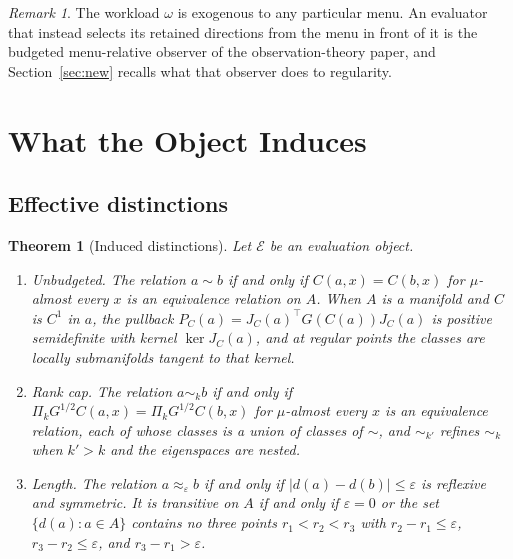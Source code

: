 \documentclass[11pt]{article}
\newtheorem{theorem}{Theorem}
\theoremstyle{definition}
\theoremstyle{remark}
\newtheorem*{remark}{Remark}
\newcommand{\Ev}{\mathcal{E}}
\newcommand{\PC}{P_{C}}
\begin{document}
\begin{remark}
The workload $\omega$ is exogenous to any particular menu.
An evaluator that instead selects its retained directions from the menu in front of it is the budgeted menu-relative observer of the observation-theory paper, and Section~\ref{sec:new} recalls what that observer does to regularity.
\end{remark}

\section{What the Object Induces}
\label{sec:derive}

\subsection{Effective distinctions}

\begin{theorem}[Induced distinctions]
\label{thm:dist}
Let $\Ev$ be an evaluation object.
\begin{enumerate}
\item[(a)] \emph{Unbudgeted.} The relation $a\sim b$ if and only if $C(a,x)=C(b,x)$ for $\mu$-almost every $x$ is an equivalence relation on $A$. When $A$ is a manifold and $C$ is $C^{1}$ in $a$, the pullback $\PC(a)=J_{C}(a)^{\top}G(C(a))J_{C}(a)$ is positive semidefinite with kernel $\ker J_{C}(a)$, and at regular points the classes are locally submanifolds tangent to that kernel.
\item[(b)] \emph{Rank cap.} The relation $a\sim_{k}b$ if and only if $\Pi_{k}G^{1/2}C(a,x)=\Pi_{k}G^{1/2}C(b,x)$ for $\mu$-almost every $x$ is an equivalence relation, each of whose classes is a union of classes of $\sim$, and $\sim_{k'}$ refines $\sim_{k}$ when $k'>k$ and the eigenspaces are nested.
\item[(c)] \emph{Length.} The relation $a\approx_{\varepsilon}b$ if and only if $|d(a)-d(b)|\le\varepsilon$ is reflexive and symmetric. It is transitive on $A$ if and only if $\varepsilon=0$ or the set $\{d(a):a\in A\}$ contains no three points $r_{1}<r_{2}<r_{3}$ with $r_{2}-r_{1}\le\varepsilon$, $r_{3}-r_{2}\le\varepsilon$, and $r_{3}-r_{1}>\varepsilon$.
\end{enumerate}
\end{theorem}
\end{document}
